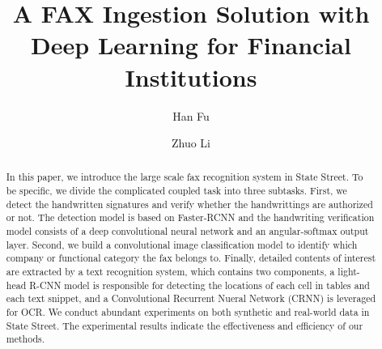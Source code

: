 \documentclass[sigconf]{acmart}
\begin{document}
%
\title{A FAX Ingestion Solution with Deep Learning for Financial Institutions}

\begin{comment}
	Financial institution fax solution means: 
	1. large scale
	2. wide variety in layout pattern

\end{comment}

%
\author{Han Fu}

\author{Zhuo Li}
%

%
\begin{abstract}
In this paper, we introduce the large scale fax recognition system in State Street. To be specific, we divide the complicated coupled task into three subtasks. First, we detect the handwritten signatures and verify whether the handwrittings are authorized or not. The detection model is based on Faster-RCNN and the handwriting verification model consists of a deep convolutional neural network and an angular-softmax output layer. Second, we build a convolutional image classification model to identify which company or functional category the fax belongs to. Finally, detailed contents of interest are extracted by a text recognition system, which contains two components, a light-head R-CNN model is responsible for detecting the locations of each cell in tables and each text snippet, and a Convolutional Recurrent Nueral Network (CRNN) is leveraged for OCR. We conduct abundant experiments on both synthetic and real-world data in State Street. The experimental results indicate the effectiveness and efficiency of our methods.

\end{abstract}
\end{document}
